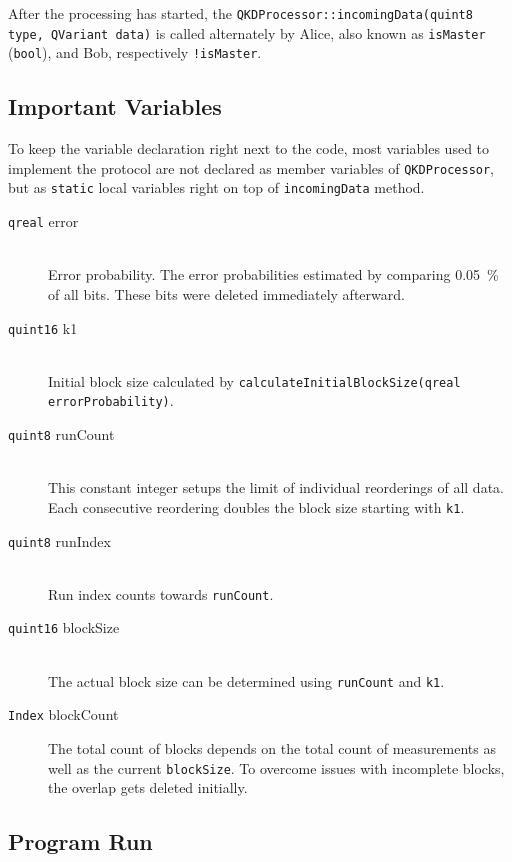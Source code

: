 \documentclass[a4paper,pdftex,DIV18,parskip=half+]{scrartcl}
\begin{document}
After the processing has started, the
\texttt{QKDProcessor::incomingData(quint8 type, QVariant data)} is called
alternately by Alice, also known as \texttt{isMaster} (\texttt{bool}), and
Bob, respectively \texttt{!isMaster}.

\subsection*{Important Variables}

To keep the variable declaration right next to the code, most variables used
to implement the protocol are not declared as member variables of
\texttt{QKDProcessor}, but as \texttt{static} local variables right on top of
\texttt{incomingData} method.

\begin{description}
  \item[\texttt{qreal} error] \hfill \\ Error probability.
        The error probabilities estimated by comparing \SI{0.05}{\percent} of
        all bits. These bits were deleted immediately afterward. 
  \item[\texttt{quint16} k1] \hfill \\ Initial block size calculated by
       \texttt{calculateInitialBlockSize(qreal errorProbability)}.
  \item[\texttt{quint8} runCount] \hfill \\ This constant integer setups the limit of
        individual reorderings of all data. Each consecutive reordering doubles
        the block size starting with \texttt{k1}.
  \item[\texttt{quint8} runIndex] \hfill \\ Run index counts towards
        \texttt{runCount}.
  \item[\texttt{quint16} blockSize] \hfill \\ The actual block size can be
        determined using \texttt{runCount} and \texttt{k1}.
  \item[\texttt{Index} blockCount] The total count of blocks depends on the
        total count of measurements as well as the current \texttt{blockSize}.
        To overcome issues with incomplete blocks, the overlap gets deleted
        initially.
\end{description}

\subsection*{Program Run}
\end{document}
